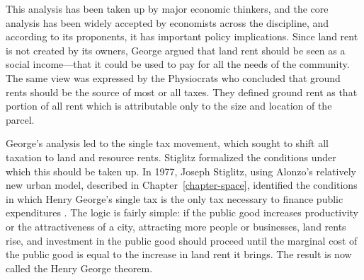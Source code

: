 This analysis has been taken up by major economic thinkers, and the core analysis has been widely accepted by economists across the discipline, and according to its proponents, it has important policy implications. 
Since land rent is not created by its owners, George argued that land rent should be seen as a social income---that it could be used to pay for all the needs of the community. %
The same view was expressed by the Physiocrats who concluded  that \gls{ground rents} should be the source of most or all taxes. They defined ground rent as that portion of all rent which is attributable only to the size and location of the parcel. 

George's analysis led to the \gls{single tax} movement, which sought to shift all taxation to land  and resource rents. Stiglitz formalized the conditions under which this should be taken up.  
In 1977, Joseph Stiglitz, using Alonzo's relatively new urban model, described in Chapter~\ref{chapter-space}, identified the conditions in which Henry George's \gls{single tax} is  the only tax necessary to finance public expenditures \cite{GET-stliglits_henry-georege-1979}. %
The logic is fairly simple: if the public good increases productivity or the attractiveness of a city, attracting more people or businesses, land rents rise, and investment in the public good should proceed until the marginal cost of the public good is equal to the increase in land rent it brings. The result is now called the \gls{Henry George theorem}. %
  


